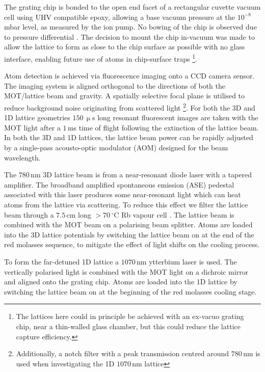 \documentclass[aps,prl,floatfix,showpacs,twocolumn,amsmath,amssymb,superscriptaddress]{revtex4-2}
\begin{document}
The grating chip is bonded to the open end facet of a rectangular cuvette vacuum cell using UHV compatible epoxy, allowing a base vacuum pressure at the $10^{-8}\,$mbar level, as measured by the ion pump. No bowing of the chip is observed due to pressure differential 
\cite{Atom_chip_vacuumSquires2016}. The decision to mount the chip in-vacuum was made to allow the lattice to form as close to the chip surface as possible with no glass interface, enabling future use of atoms in chip-surface traps \footnote{The lattices here could in principle be achieved with an ex-vacuo grating chip, near a thin-walled glass chamber, but this could reduce the lattice capture efficiency.}.

Atom detection is achieved via fluorescence imaging onto a CCD camera sensor. The imaging system is aligned orthogonal to the directions of both the MOT/lattice beam and gravity. 
A spatially selective focal plane is utilised to reduce background noise originating from scattered light \footnote{Additionally, a notch filter with a peak transmission centred around $780\,$nm is used when investigating the 1D $1070\,$nm lattice}. For both the 3D and 1D lattice geometries $150\,\upmu$s long resonant fluorescent images are taken with the MOT light after a $1\,$ms time of flight following the extinction of the lattice beam. 
In both the 3D and 1D lattices, the lattice beam power can be rapidly adjusted by a single-pass acousto-optic modulator (AOM) designed for the beam wavelength. 

The $780\,$nm 3D lattice beam is from a near-resonant diode laser \cite{Thompson2012} with a tapered amplifier. The broadband amplified spontaneous emission (ASE) pedestal associated with this laser produces some near-resonant light which can heat atoms from the lattice via scattering. To reduce this effect we filter the lattice beam through a $7.5\,$cm long $>70\,^\circ$C Rb vapour cell 
\cite{ASE_hot_cell_Daffurn2021}. 
The lattice beam is combined with the MOT beam on a polarising beam splitter.
Atoms are loaded into the 3D lattice potentials by switching the lattice beam on at the end of the red molasses sequence, to mitigate the effect of light shifts on the cooling process. 

To form the far-detuned 1D lattice a $1070\,$nm ytterbium 
laser is used. The vertically polarised light is combined with the MOT light on a dichroic mirror and aligned onto the grating chip. 
Atoms are loaded into the 1D lattice by switching the lattice beam on at the beginning of the red molasses cooling stage.  
\end{document}
